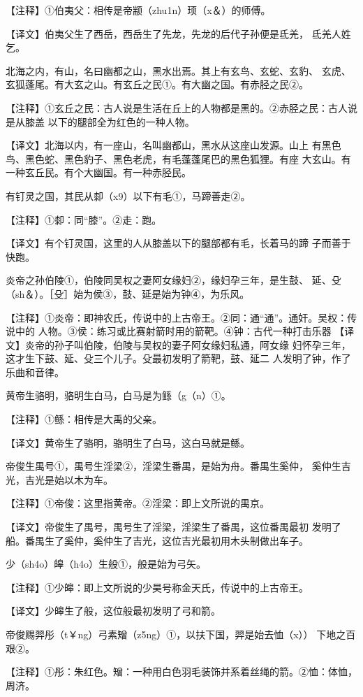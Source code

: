 \documentclass[a4paper,12pt,UTF8,twoside]{ctexbook}
\begin{document}
【注释】①伯夷父：相传是帝颛（zhu1n）顼（x＆）的师傅。

【译文】伯夷父生了西岳，西岳生了先龙，先龙的后代子孙便是氐羌， 氐羌人姓乞。

北海之内，有山，名曰幽都之山，黑水出焉。其上有玄鸟、玄蛇、玄豹、 玄虎、玄狐蓬尾。有大玄之山。有玄丘之民①。有大幽之国。有赤胫之民②。

【注释】①玄丘之民：古人说是生活在丘上的人物都是黑的。②赤胫之民：古人说是从膝盖 以下的腿部全为红色的一种人物。

【译文】北海以内，有一座山，名叫幽都山，黑水从这座山发源。山上 有黑色鸟、黑色蛇、黑色豹子、黑色老虎，有毛蓬蓬尾巴的黑色狐狸。有座 大玄山。有一种玄丘民。有个大幽国。有一种赤胫民。

有钉灵之国，其民从厀（x9）以下有毛①，马蹄善走②。

【注释】①厀：同“膝”。②走：跑。

【译文】有个钉灵国，这里的人从膝盖以下的腿部都有毛，长着马的蹄 子而善于快跑。

炎帝之孙伯陵①，伯陵同吴权之妻阿女缘妇②，缘妇孕三年，是生鼓、 延、殳（sh＆）。［殳］始为侯③，鼓、延是始为钟④，为乐风。

【注释】①炎帝：即神农氏，传说中的上古帝王。②同：通“通”。通奸。吴权：传说中的 人物。③侯：练习或比赛射箭时用的箭靶。④钟：古代一种打击乐器 【译文】炎帝的孙子叫伯陵，伯陵与吴权的妻子阿女缘妇私通，阿女缘 妇怀孕三年，这才生下鼓、延、殳三个儿子。殳最初发明了箭靶，鼓、延二 人发明了钟，作了乐曲和音律。

黄帝生骆明，骆明生白马，白马是为鲧（g（n）①。

【注释】①鲧：相传是大禹的父亲。

【译文】黄帝生了骆明，骆明生了白马，这白马就是鲧。

帝俊生禺号①，禺号生淫梁②，淫梁生番禺，是始为舟。番禺生奚仲， 奚仲生吉光，吉光是始以木为车。

【注释】①帝俊：这里指黄帝。②淫梁：即上文所说的禺京。

【译文】帝俊生了禺号，禺号生了淫梁，淫梁生了番禺，这位番禺最初 发明了船。番禺生了奚仲，奚仲生了吉光，这位吉光最初用木头制做出车子。

少（sh4o）皞（h4o）生般①，般是始为弓矢。

【注释】①少皞：即上文所说的少昊号称金天氏，传说中的上古帝王。

【译文】少皞生了般，这位般最初发明了弓和箭。

帝俊赐羿彤（t￥ng）弓素矰（z5ng）①，以扶下国，羿是始去恤（x）） 下地之百艰②。

【注释】①彤：朱红色。矰：一种用白色羽毛装饰并系着丝绳的箭。②恤：体恤，周济。
\end{document}
